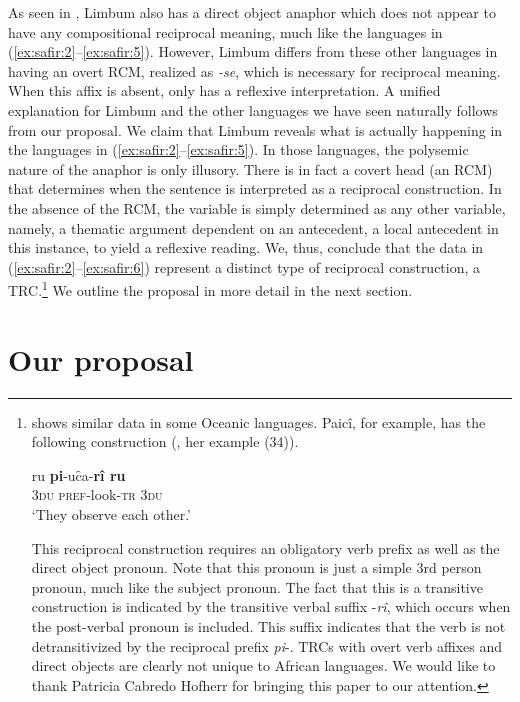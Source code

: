 \documentclass[output=paper]{langsci/langscibook}
\begin{document}
As seen in , Limbum also has a direct object anaphor which does not appear to have any compositional reciprocal meaning, much like the languages in (\ref{ex:safir:2}--\ref{ex:safir:5}). However, Limbum differs from these other languages in having an overt RCM, realized as \textit{-se}, which is necessary for reciprocal meaning. When this affix is absent,  only has a reflexive interpretation. A unified explanation for Limbum and the other languages we have seen naturally follows from our proposal. We claim that Limbum reveals what is actually happening in the languages in (\ref{ex:safir:2}--\ref{ex:safir:5}). In those languages, the polysemic nature of the anaphor is only illusory. There is in fact a covert head (an RCM) that determines when the sentence is interpreted as a reciprocal construction. In the absence of the RCM, the variable is simply determined as any other variable, namely, a thematic argument dependent on an antecedent, a local antecedent in this instance, to yield a reflexive reading. We, thus, conclude that the data in (\ref{ex:safir:2}--\ref{ex:safir:6}) represent a distinct type of reciprocal construction, a TRC.\footnote{\citet{MoyseFaurie2008} shows similar data in some Oceanic languages. Paicî, for example, has the following construction (\citealt[121]{MoyseFaurie2008}, her example (34)).

\ea
\gll  ru  \textbf{pi}-uc̑a-\textbf{rî  ru}\\
 \textsc{3du}  \textsc{pref}-look-\textsc{tr}  \textsc{3du}\\
\glt  ‘They observe each other.’
\z

This reciprocal construction requires an obligatory verb prefix as well as the direct object pronoun. Note that this pronoun is just a simple 3rd person pronoun, much like the subject pronoun. The fact that this is a transitive construction is indicated by the transitive verbal suffix -\textit{rî}, which occurs when the post-verbal pronoun is included. This suffix indicates that the verb is not detransitivized by the reciprocal prefix \textit{pi}-. TRCs with overt verb affixes and direct objects are clearly not unique to African languages. We would like to thank Patricia Cabredo Hofherr for bringing this paper to our attention.} We outline the proposal in more detail in the next section.

\section{Our proposal} 
\end{document}
